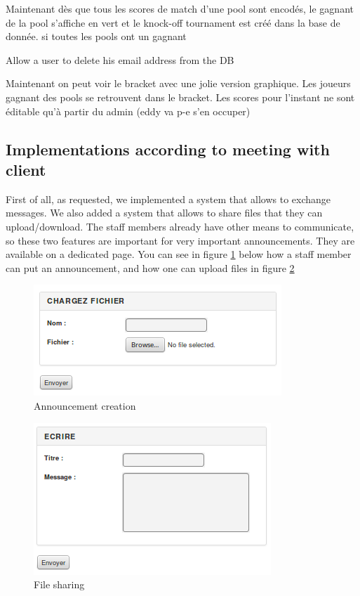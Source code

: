 \documentclass[a4paper, 12pt]{article}
\begin{document}
Maintenant dès que tous les scores de match d'une pool sont encodés, le gagnant de la pool s'affiche en vert et le knock-off tournament est créé dans la base de donnée.
si toutes les pools ont un gagnant

Allow a user to delete his email address from the DB

Maintenant on peut voir le bracket avec une jolie version graphique. Les joueurs gagnant des pools se retrouvent dans le bracket. Les scores pour l'instant ne sont éditable qu'à partir du admin (eddy va p-e s'en occuper)
\subsection*{Implementations according to meeting with client}

First of all, as requested, we implemented a system that allows to exchange messages. We also added a system that allows to share files that they can upload/download. The staff members already have other means to communicate, so these two features are important for very important announcements. They are available on a dedicated page. You can see in figure \ref{annonce} below how a staff member can put an announcement, and how one can upload files in figure \ref{file} \\
\begin{figure}[h]
  \caption{\label{annonce} Announcement creation}
  \includegraphics[scale=0.7]{annonce.png}
\end{figure}
\begin{figure}[h]
  \caption{\label{file} File sharing}
  \includegraphics[scale=0.7]{fichier.png}
\end{figure}
\end{document}
